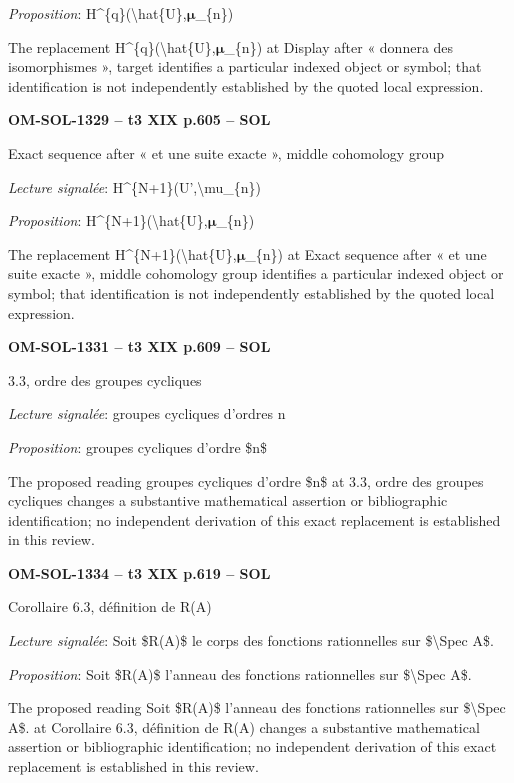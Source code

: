 \emph{Proposition}: H\textasciicircum{}\{q\}(\textbackslash{}hat\{U\},\ensuremath{𝛍}\_\{n\})\par
The replacement H\textasciicircum{}\{q\}(\textbackslash{}hat\{U\},\ensuremath{𝛍}\_\{n\}) at Display after « donnera des isomorphismes », target identifies a particular indexed object or symbol; that identification is not independently established by the quoted local expression.\par
\par\noindent\textbf{OM-SOL-1329 -- t3 XIX p.605 -- SOL}\par
Exact sequence after « et une suite exacte », middle cohomology group\par
\emph{Lecture signalée}: H\textasciicircum{}\{N+1\}(U',\textbackslash{}mu\_\{n\})\par
\emph{Proposition}: H\textasciicircum{}\{N+1\}(\textbackslash{}hat\{U\},\ensuremath{𝛍}\_\{n\})\par
The replacement H\textasciicircum{}\{N+1\}(\textbackslash{}hat\{U\},\ensuremath{𝛍}\_\{n\}) at Exact sequence after « et une suite exacte », middle cohomology group identifies a particular indexed object or symbol; that identification is not independently established by the quoted local expression.\par
\par\noindent\textbf{OM-SOL-1331 -- t3 XIX p.609 -- SOL}\par
3.3, ordre des groupes cycliques\par
\emph{Lecture signalée}: groupes cycliques d'ordres n\par
\emph{Proposition}: groupes cycliques d'ordre \$n\$\par
The proposed reading groupes cycliques d'ordre \$n\$ at 3.3, ordre des groupes cycliques changes a substantive mathematical assertion or bibliographic identification; no independent derivation of this exact replacement is established in this review.\par
\par\noindent\textbf{OM-SOL-1334 -- t3 XIX p.619 -- SOL}\par
Corollaire 6.3, définition de R(A)\par
\emph{Lecture signalée}: Soit \$R(A)\$ le corps des fonctions rationnelles sur \$\textbackslash{}Spec A\$.\par
\emph{Proposition}: Soit \$R(A)\$ l'anneau des fonctions rationnelles sur \$\textbackslash{}Spec A\$.\par
The proposed reading Soit \$R(A)\$ l'anneau des fonctions rationnelles sur \$\textbackslash{}Spec A\$. at Corollaire 6.3, définition de R(A) changes a substantive mathematical assertion or bibliographic identification; no independent derivation of this exact replacement is established in this review.\par
